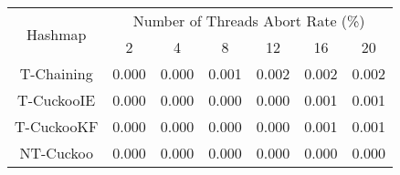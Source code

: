 \begin{tabular}{|c|c|c|c|c|c|c|}
\hline
\multirow{2}{*}{Hashmap} & \multicolumn{6}{c|}{Number of Threads Abort Rate (\%)}\\\cline{2-7}& 2 & 4 & 8 & 12 & 16 & 20\\
\hline
\hline
T-Chaining & 0.000 & 0.000 & 0.001 & 0.002 & 0.002 & 0.002\\
T-CuckooIE & 0.000 & 0.000 & 0.000 & 0.000 & 0.001 & 0.001\\
T-CuckooKF & 0.000 & 0.000 & 0.000 & 0.000 & 0.001 & 0.001\\
NT-Cuckoo & 0.000 & 0.000 & 0.000 & 0.000 & 0.000 & 0.000\\
\hline
\end{tabular}
